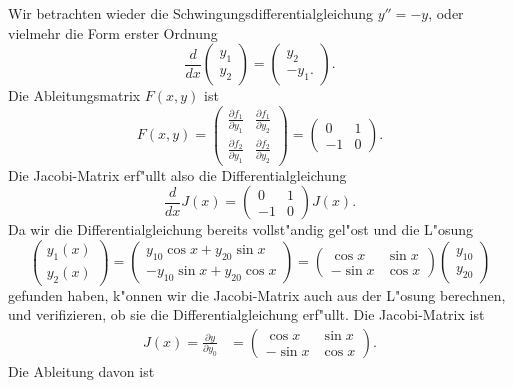 \begin{beispiel}
Wir betrachten wieder die Schwingungsdifferentialgleichung $y''=-y$,
oder vielmehr die Form erster Ordnung
\[
\frac{d}{dx}\begin{pmatrix}y_1\\y_2\end{pmatrix}
=
\begin{pmatrix}
y_2\\-y_1.
\end{pmatrix}.
\]
Die Ableitungsmatrix $F(x,y)$ ist
\[
F(x,y)
=
\begin{pmatrix}
\displaystyle\frac{\partial f_1}{\partial y_1}&\displaystyle\frac{\partial f_1}{\partial y_2}\\
\displaystyle\frac{\partial f_2}{\partial y_1}&\displaystyle\frac{\partial f_2}{\partial y_2}
\end{pmatrix}
=
\begin{pmatrix}
 0&1\\
-1&0
\end{pmatrix}.
\]
Die Jacobi-Matrix erf"ullt also die Differentialgleichung
\[
\frac{d}{dx}J(x)=\begin{pmatrix}0&1\\-1&0\end{pmatrix}J(x).
\]
Da wir die Differentialgleichung bereits vollst"andig gel"ost und
die L"osung
\[
\begin{pmatrix}
y_1(x)\\y_2(x)
\end{pmatrix}
=
\begin{pmatrix}
 y_{10}\cos x+y_{20}\sin x\\
-y_{10}\sin x+y_{20}\cos x
\end{pmatrix}
=
\begin{pmatrix}
 \cos x&\sin x\\
-\sin x&\cos x
\end{pmatrix}
\begin{pmatrix}y_{10}\\y_{20}\end{pmatrix}
\]
gefunden haben, k"onnen wir die Jacobi-Matrix auch aus der L"osung berechnen,
und verifizieren, ob sie die Differentialgleichung erf"ullt.
Die Jacobi-Matrix ist
\begin{align*}
J(x)
=
\frac{\partial y}{\partial y_0}
&=
\begin{pmatrix}
 \cos x&\sin x\\
-\sin x&\cos x
\end{pmatrix}.
\end{align*}
Die Ableitung davon ist

\end{beispiel}
